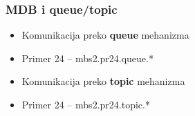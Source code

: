 \documentclass[compress]{beamer}
\begin{document}
\begin{frame}
  \frametitle{MDB i queue/topic}
  \begin{itemize}
    \item Komunikacija preko \textbf{queue} mehanizma
    \item Primer 24 -- mbs2.pr24.queue.*
  \end{itemize}
  
  \begin{itemize}
    \item Komunikacija preko \textbf{topic} mehanizma
    \item Primer 24 -- mbs2.pr24.topic.*
  \end{itemize}
\end{frame}
\end{document}
